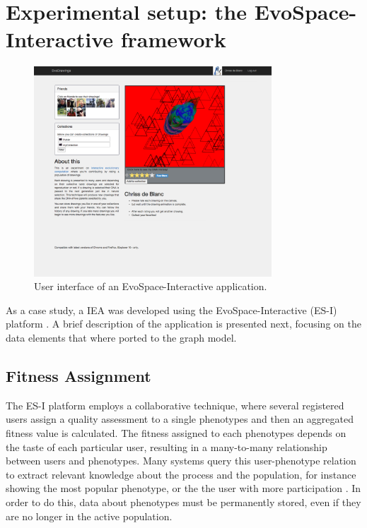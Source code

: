 \documentclass[conference]{IEEEtran}
\begin{document}


\section{Experimental setup: the EvoSpace-Interactive framework}
\label{sec:evospace-i}
\begin{figure}[!t]
    \centering
        \includegraphics[width=3.5in]{img/UI_ed01.png}
    \caption{User interface of an EvoSpace-Interactive application.}
    \label{fig:web}
\end{figure}

As a case study, a IEA was developed using the 
EvoSpace-Interactive (ES-I) platform \cite{garcia2013evospace}. %
A brief description of the application is presented next, focusing
on the data elements that where ported to the graph model.

\subsection{Fitness Assignment}
\label{sec:assignment}
The ES-I platform employs a collaborative technique,
where several registered users assign a quality assessment to a single
phenotypes and then an aggregated fitness value is calculated. The fitness
assigned to each phenotypes depends on the taste of each particular user, 
resulting in a many-to-many relationship between users and phenotypes. 
Many systems query this user-phenotype relation to extract relevant
knowledge about the process and the population, for instance showing the
most popular phenotype, or the the user with more participation 
\cite{picbreeder}.
In order to do this, data about phenotypes 
must be permanently stored, even
if they are no longer in the active population. 
\end{document}
